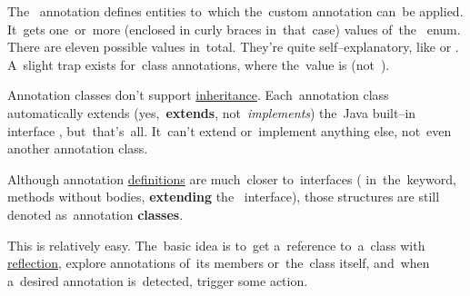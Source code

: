 \noindent The~ annotation defines entities to~which the~custom annotation can~be applied.
It~gets one~or~more (enclosed in curly braces in~that~case) values of~the~ enum.
There are eleven possible values in~total.
They're quite self--explanatory, like  or .
A~slight trap exists for~class annotations, where the~value is  \mbox{(not )}.

\warning Annotation classes don't support \hyperref[inheritance]{inheritance}.
Each~annotation class automatically extends (yes,~\textbf{extends}, not~\textit{implements}) the~Java built--in interface , but~that's~all.
It~can't extend or~implement anything else, not~even another annotation class.
\newpage

\warning Although annotation \hyperref[declarationdefinition]{definitions} are much~closer to~interfaces ( in~the~keyword, methods without bodies, \textbf{extending} \mbox{the } interface), those structures are still denoted as~annotation \textbf{classes}.

This is relatively easy.
The~basic idea is to~get a~reference to~a~class with \hyperref[reflection]{reflection}, explore annotations of~its members or~the~class itself, and~when a~desired annotation is~detected, trigger some action.

